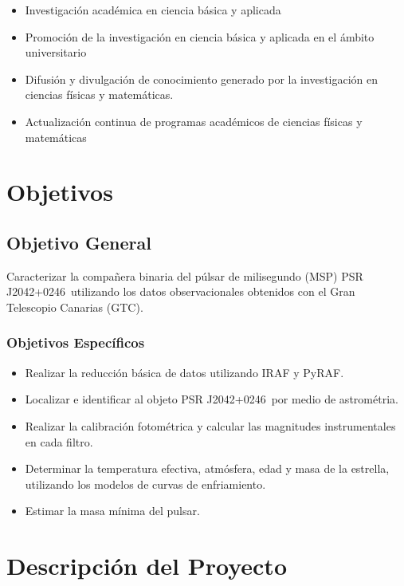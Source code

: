 \documentclass[12pt,spanish,letterpage, twoside, openright]{article}
\newcommand{\object}{PSR J2042+0246~}
\begin{document}
\begin{itemize}
	\item Investigación académica en ciencia básica y aplicada
	\item Promoción de la investigación en ciencia básica y aplicada en el ámbito universitario
	\item  Difusión y divulgación de conocimiento generado por la investigación en ciencias físicas y matemáticas.
	\item  Actualización continua de programas académicos de ciencias físicas y matemáticas
\end{itemize}

\section{Objetivos}
\subsection{Objetivo General}
Caracterizar la compañera binaria del púlsar de milisegundo (MSP) \object utilizando los datos observacionales obtenidos con el  Gran Telescopio Canarias (GTC).
\subsubsection{Objetivos Específicos}
\begin{itemize}
    \item Realizar la reducción básica de datos utilizando IRAF y PyRAF.
    \item Localizar e identificar al objeto \object por medio de astrométria.
    \item Realizar la calibración fotométrica y calcular las magnitudes instrumentales en cada filtro.
    \item Determinar la temperatura efectiva, atmósfera, edad y masa de la estrella, utilizando los modelos de curvas de enfriamiento.
    \item Estimar la masa mínima del pulsar.
\end{itemize}


	\section{Descripción del Proyecto}


\end{document}

